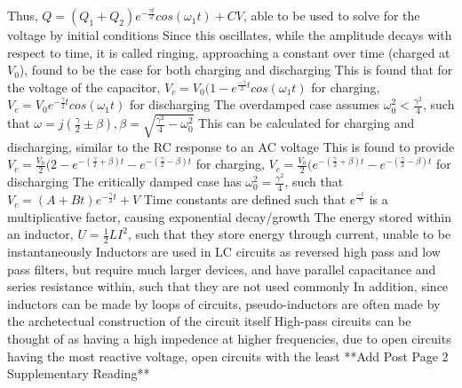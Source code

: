 \documentclass[11 pt, twoside]{article}
\newenvironment{outline*}
{
	\begin{outline}[enumerate]
	}
	{\end{outline}
}
\begin{document}
\begin{outline*}
		\3 Thus, $Q = (Q_1 + Q_2)e^{-\frac{\gamma t}{2}}cos(\omega_1 t) + CV$, able to be used to solve for the voltage by initial conditions
		\3 Since this oscillates, while the amplitude decays with respect to time, it is called ringing, approaching a constant over time (charged at $V_0$), found to be the case for both charging and discharging
		\3 This is found that for the voltage of the capacitor, $V_c = V_0(1 - e^{\frac{-\gamma}{2}t}cos(\omega_1 t)$ for charging, $V_c = V_0e^{-\frac{\gamma}{2}t}cos(\omega_1t)$ for discharging
	\2 The overdamped case assumes $\omega_0^2 < \frac{\gamma^2}{4}$, such that $\omega = j(\frac{\gamma}{2} \pm \beta), \beta = \sqrt{\frac{\gamma^2}{4} - \omega_0^2}$
		\3 This can be calculated for charging and discharging, similar to the RC response to an AC voltage
		\3 This is found to provide $V_c = \frac{V_0}{2}(2 - e^{-(\frac{\gamma}{2} + \beta)t} - e^{-(\frac{\gamma}{2} - \beta)t}$ for charging, $V_c = \frac{V_0}{2}(e^{-(\frac{\gamma}{2} + \beta)t} - e^{-(\frac{\gamma}{2} - \beta)t}$ for discharging
	\2 The critically damped case has $\omega_0^2 = \frac{\gamma^2}{4}$, such that $V_c = (A + Bt)e^{-\frac{\gamma}{2}t} + V$
	\2 Time constants are defined such that $e^{\frac{-t}{\tau}}$ is a multiplicative factor, causing exponential decay/growth
\1 The energy stored within an inductor, $U = \frac{1}{2}LI^2$, such that they store energy through current, unable to be instantaneously
	\2 Inductors are used in LC circuits as reversed high pass and low pass filters, but require much larger devices, and have parallel capacitance and series resistance within, such that they are not used commonly
	\2 In addition, since inductors can be made by loops of circuits, pseudo-inductors are often made by the archetectual construction of the circuit itself
\1 High-pass circuits can be thought of as having a high impedence at higher frequencies, due to open circuits having the most reactive voltage, open circuits with the least
\1 **Add Post Page 2 Supplementary Reading**
\end{outline*}
\end{document}
